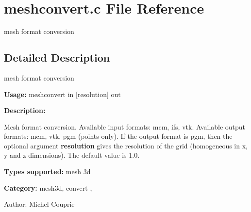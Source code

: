 \section{meshconvert.c File Reference}
\label{meshconvert_8c}
mesh format conversion  




\label{_details}
\subsection{Detailed Description}
mesh format conversion 

{\bf Usage:} meshconvert in [resolution] out

{\bf Description:}

Mesh format conversion. Available input formats: mcm, ifs, vtk. Available output formats: mcm, vtk, pgm (points only). If the output format is pgm, then the optional argument {\bf resolution} gives the resolution of the grid (homogeneous in x, y and z dimensions). The default value is 1.0.

{\bf Types supported:} mesh 3d

{\bf Category:} mesh3d, convert ,

\begin{Desc}
\item[Author:]Michel Couprie \end{Desc}
